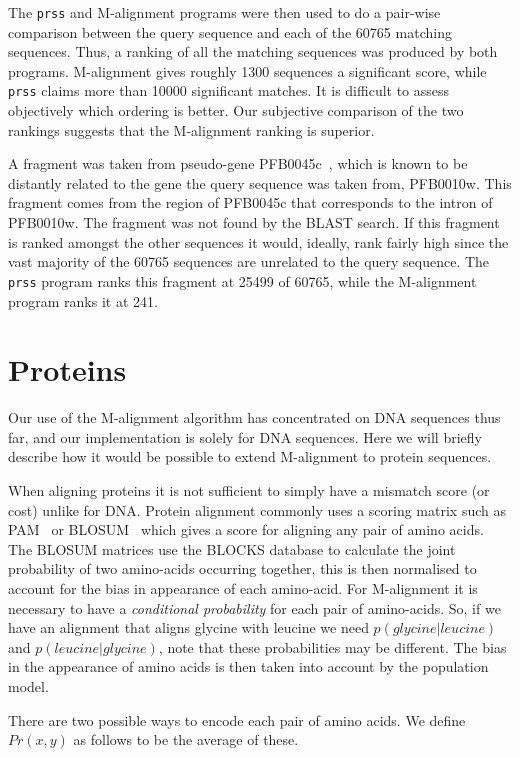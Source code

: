 \documentclass[letterpaper,11pt,oneside]{article}
\begin{document}
\begin{multicols}{2}
The \verb!prss! and M-alignment programs were then used to do a pair-wise
comparison between the query sequence and each of the 60765 matching
sequences.  Thus, a ranking of all the matching sequences was produced by both
programs.  M-alignment gives roughly 1300 sequences a significant score, while
\verb!prss! claims more than 10000 significant matches.  It is difficult
to assess objectively which ordering is better.  Our subjective comparison of
the two rankings suggests that the M-alignment ranking is superior.

A fragment was taken from pseudo-gene PFB0045c~\cite{huestis01}, which is
known to be distantly related to the gene the query sequence was taken from,
PFB0010w.  This fragment comes from the region of PFB0045c that corresponds to
the intron of PFB0010w.  The fragment was not found by the BLAST search.  If
this fragment is ranked amongst the other sequences it would, ideally, rank
fairly high since the vast majority of the 60765 sequences are unrelated to
the query sequence.  The \verb!prss! program ranks this fragment at 25499 of
60765, while the M-alignment program ranks it at 241.

\section{Proteins}
\label{sec:proteins}

Our use of the M-alignment algorithm has concentrated on DNA sequences thus
far, and our implementation is solely for DNA sequences.  Here we will briefly
describe how it would be possible to extend M-alignment to protein sequences.

When aligning proteins it is not sufficient to simply have a mismatch score
(or cost) unlike for DNA.  Protein alignment commonly uses a scoring matrix
such as PAM~\cite{dayhoff78} or BLOSUM~\cite{henikoff92} which gives a score
for aligning any pair of amino acids.  The BLOSUM matrices use the BLOCKS
database to calculate the joint probability of two amino-acids occurring
together, this is then normalised to account for the bias in appearance of
each amino-acid.  For M-alignment it is necessary to have a {\em conditional
probability} for each pair of amino-acids.  So, if we have an alignment that
aligns glycine with leucine we need $p(glycine | leucine)$ and $p(leucine |
glycine)$, note that these probabilities may be different.  The bias in the
appearance of amino acids is then taken into account by the population model.

There are two possible ways to encode each pair of amino acids.  We define
$Pr(x,y)$ as follows to be the average of these.


\end{multicols}
\end{document}
